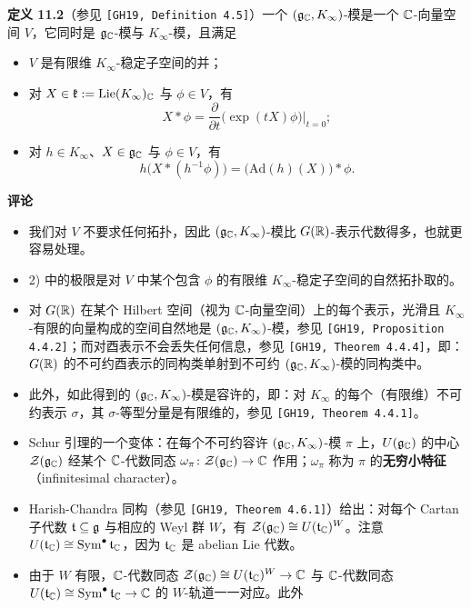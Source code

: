 \medskip
\noindent\textbf{定义 11.2}（参见 \texttt{[GH19, Definition 4.5]}）\label{def:11.2}\quad 一个 $(\mathfrak{g}_{\mathbb{C}},K_\infty)$-模是一个 $\mathbb{C}$-向量空间 $V$，它同时是 $\mathfrak{g}_{\mathbb{C}}$-模与 $K_\infty$-模，且满足
\begin{itemize}
\item[1)] $V$ 是有限维 $K_\infty$-稳定子空间的并；
\item[2)] 对 $X\in\mathfrak k:=\operatorname{Lie}(K_\infty)_{\mathbb{C}}$ 与 $\phi\in V$，有
\[
X*\phi=\frac{\partial}{\partial t}\bigl(\exp(tX)\phi\bigr)\Big|_{t=0};
\]
\item[3)] 对 $h\in K_\infty$、$X\in\mathfrak{g}_{\mathbb{C}}$ 与 $\phi\in V$，有
\[
h\bigl(X*(h^{-1}\phi)\bigr)=\bigl(\mathrm{Ad}(h)(X)\bigr)*\phi.
\]
\end{itemize}

\medskip
\noindent\textbf{评论}
\begin{itemize}
\item 我们对 $V$ 不要求任何拓扑，因此 $(\mathfrak{g}_{\mathbb{C}},K_\infty)$-模比 $G(\mathbb{R})$-表示代数得多，也就更容易处理。
\item 2) 中的极限是对 $V$ 中某个包含 $\phi$ 的有限维 $K_\infty$-稳定子空间的自然拓扑取的。
\item 对 $G(\mathbb{R})$ 在某个 Hilbert 空间（视为 $\mathbb{C}$-向量空间）上的每个表示，光滑且 $K_\infty$-有限的向量构成的空间自然地是 $(\mathfrak{g}_{\mathbb{C}},K_\infty)$-模，参见 \texttt{[GH19, Proposition 4.4.2]}；而对酉表示不会丢失任何信息，参见 \texttt{[GH19, Theorem 4.4.4]}，即：$G(\mathbb{R})$ 的不可约酉表示的同构类单射到不可约 $(\mathfrak{g}_{\mathbb{C}},K_\infty)$-模的同构类中。
\item 此外，如此得到的 $(\mathfrak{g}_{\mathbb{C}},K_\infty)$-模是容许的，即：对 $K_\infty$ 的每个（有限维）不可约表示 $\sigma$，其 $\sigma$-等型分量是有限维的，参见 \texttt{[GH19, Theorem 4.4.1]}。
\item Schur 引理的一个变体：在每个不可约容许 $(\mathfrak{g}_{\mathbb{C}},K_\infty)$-模 $\pi$ 上，$U(\mathfrak{g}_{\mathbb{C}})$ 的中心 $\mathcal{Z}(\mathfrak{g}_{\mathbb{C}})$ 经某个 $\mathbb{C}$-代数同态 $\omega_\pi\colon\mathcal{Z}(\mathfrak{g}_{\mathbb{C}})\to\mathbb{C}$ 作用；$\omega_\pi$ 称为 $\pi$ 的\textbf{无穷小特征}（infinitesimal character）。
\item Harish-Chandra 同构（参见 \texttt{[GH19, Theorem 4.6.1]}）给出：对每个 Cartan 子代数 $\mathfrak t\subseteq\mathfrak{g}$ 与相应的 Weyl 群 $W$，有 $\mathcal{Z}(\mathfrak{g}_{\mathbb{C}})\cong U(\mathfrak t_{\mathbb{C}})^W$。注意 $U(\mathfrak t_{\mathbb{C}})\cong\operatorname{Sym}^\bullet\mathfrak t_{\mathbb{C}}$，因为 $\mathfrak t_{\mathbb{C}}$ 是 abelian Lie 代数。
\item 由于 $W$ 有限，$\mathbb{C}$-代数同态 $\mathcal{Z}(\mathfrak{g}_{\mathbb{C}})\cong U(\mathfrak t_{\mathbb{C}})^W\to\mathbb{C}$ 与 $\mathbb{C}$-代数同态 $U(\mathfrak t_{\mathbb{C}})\cong\operatorname{Sym}^\bullet\mathfrak t_{\mathbb{C}}\to\mathbb{C}$ 的 $W$-轨道一一对应。此外

\end{itemize}
